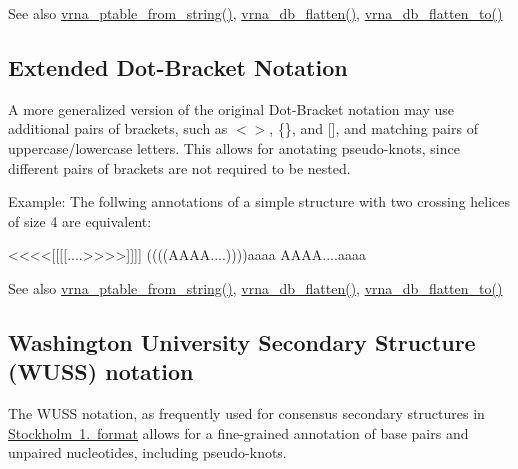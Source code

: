 \begin{DoxySeeAlso}{See also}
\mbox{\hyperlink{group__struct__utils_gac76c9ef3de507748fb0416a59323362b}{vrna\+\_\+ptable\+\_\+from\+\_\+string()}}, \mbox{\hyperlink{group__struct__utils_gae966b9f44168a4f4b39ca42ffb5f37b7}{vrna\+\_\+db\+\_\+flatten()}}, \mbox{\hyperlink{group__struct__utils_ga690425199c8b71545e7196e3af1436f8}{vrna\+\_\+db\+\_\+flatten\+\_\+to()}}
\end{DoxySeeAlso}
\hypertarget{rna_structure_notations_dot-bracket-ext-notation}{}\subsection{Extended Dot-\/\+Bracket Notation}\label{rna_structure_notations_dot-bracket-ext-notation}
A more generalized version of the original Dot-\/\+Bracket notation may use additional pairs of brackets, such as {\ttfamily $<$$>$}, {\ttfamily \{\}}, and {\ttfamily \mbox{[}\mbox{]}}, and matching pairs of uppercase/lowercase letters. This allows for anotating pseudo-\/knots, since different pairs of brackets are not required to be nested.

Example\+: The follwing annotations of a simple structure with two crossing helices of size 4 are equivalent\+: \begin{DoxyVerb}<<<<[[[[....>>>>]]]]
((((AAAA....))))aaaa
AAAA{{{{....aaaa}}}}
\end{DoxyVerb}


\begin{DoxySeeAlso}{See also}
\mbox{\hyperlink{group__struct__utils_gac76c9ef3de507748fb0416a59323362b}{vrna\+\_\+ptable\+\_\+from\+\_\+string()}}, \mbox{\hyperlink{group__struct__utils_gae966b9f44168a4f4b39ca42ffb5f37b7}{vrna\+\_\+db\+\_\+flatten()}}, \mbox{\hyperlink{group__struct__utils_ga690425199c8b71545e7196e3af1436f8}{vrna\+\_\+db\+\_\+flatten\+\_\+to()}}
\end{DoxySeeAlso}
\hypertarget{rna_structure_notations_wuss-notation}{}\subsection{Washington University Secondary Structure (\+W\+U\+S\+S) notation}\label{rna_structure_notations_wuss-notation}
The W\+U\+SS notation, as frequently used for consensus secondary structures in \mbox{\hyperlink{file_formats_msa-formats-stockholm}{Stockholm 1. format}} allows for a fine-\/grained annotation of base pairs and unpaired nucleotides, including pseudo-\/knots.

